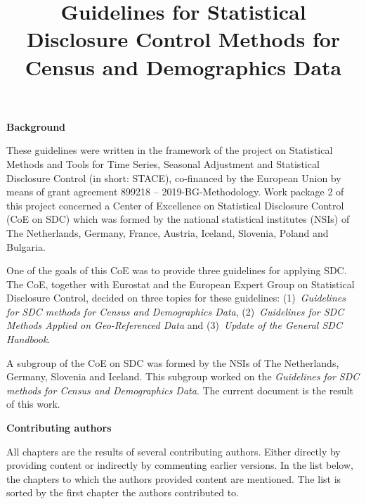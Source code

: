 \documentclass[openany,oneside]{book}
\title{Guidelines for Statistical Disclosure Control Methods for Census and Demographics Data}
\author{}
\date{}
\begin{document}


\thispagestyle{empty}
\noindent \textbf{\large Background}\bigskip

\noindent These guidelines were written in the framework of the project on Statistical Methods and Tools for Time Series, Seasonal Adjustment and Statistical Disclosure Control (in short: STACE), co-financed by the European Union by means of grant agreement 899218 -- 2019-BG-Methodology. Work package 2 of this project concerned a Center of Excellence on Statistical Disclosure Control (CoE on SDC) which was formed by the national statistical institutes (NSIs) of The Netherlands, Germany, France, Austria, Iceland, Slovenia, Poland and Bulgaria.

One of the goals of this CoE was to provide three guidelines for applying SDC. The CoE, together with Eurostat and the European Expert Group on Statistical Disclosure Control, decided on three topics for these guidelines: (1)~\textit{Guidelines for SDC methods for Census and Demographics Data}, (2)~\textit{Guidelines for SDC Methods Applied on Geo-Referenced Data} and (3)~\textit{Update of the General SDC Handbook}.

A subgroup of the CoE on SDC was formed by the NSIs of The Netherlands, Germany, Slovenia and Iceland. This subgroup worked on the \textit{Guidelines for SDC methods for Census and Demographics Data}. The current document is the result of this work.

\maketitle
\thispagestyle{empty}

\noindent \textbf{\large Contributing authors}\bigskip

\noindent All chapters are the results of several contributing authors. Either directly by providing content or indirectly by commenting earlier versions. In the list below, the chapters to which the authors provided content are mentioned. The list is sorted by the first chapter the authors contributed to.
\bigskip
\end{document}
